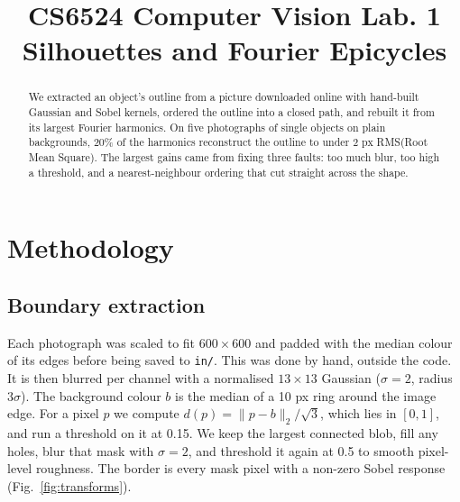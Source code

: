 \documentclass[conference]{IEEEtran}
\begin{document}
    \title{CS6524 Computer Vision Lab. 1\\ Silhouettes and Fourier Epicycles}

    \author{
    \and
    \and
    }

    \maketitle

    \begin{abstract}
        We extracted an object's outline from a picture downloaded online with hand-built Gaussian and Sobel kernels, ordered the outline into a closed path, and rebuilt it from its largest Fourier harmonics.
        On five photographs of single objects on plain backgrounds, 20\% of the harmonics reconstruct the outline to under 2 px RMS(Root Mean Square).
        The largest gains came from fixing three faults: too much blur, too high a threshold, and a nearest-neighbour ordering that cut straight across the shape.
    \end{abstract}

    \section{Methodology}\label{sec:methodology}

    \subsection{Boundary extraction}\label{subsec:boundary-extraction}
    Each photograph was scaled to fit $600\times600$ and padded with the median colour of its edges before being saved to \texttt{in/}.
    This was done by hand, outside the code.
    It is then blurred per channel with a normalised $13\times13$ Gaussian ($\sigma=2$, radius $3\sigma$).
    The background colour $b$ is the median of a 10 px ring around the image edge.
    For a pixel $p$ we compute $d(p)=\lVert p-b\rVert_2/\sqrt{3}$, which lies in $[0,1]$, and run a threshold on it at 0.15.
    We keep the largest connected blob, fill any holes, blur that mask with $\sigma=2$, and threshold it again at 0.5 to smooth pixel-level roughness.
    The border is every mask pixel with a non-zero Sobel response (Fig.~\ref{fig:transforms}).
\end{document}
